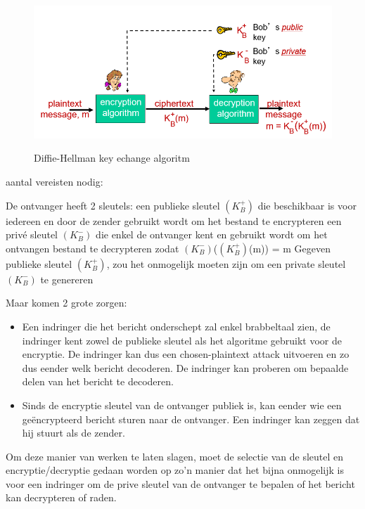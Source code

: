 \begin{figure}[h]
    \centering
    \includegraphics[width=7in]{./img/imghfdst8/hfdst8puntje5.png}\\[1cm]
    \caption{Diffie-Hellman key echange algoritm }      
    \label{fig:Diffie-Hellman key echange algoritm }
\end{figure}

\noindent aantal vereisten nodig:

\be
\itf De ontvanger heeft 2 sleutels:
    \be
    \itf een publieke sleutel $(K^+_B)$ die beschikbaar is voor iedereen en door de zender gebruikt wordt om het bestand te encrypteren
    \itf een privé sleutel $(K^-_B)$ die enkel de ontvanger kent en gebruikt wordt om het ontvangen bestand te decrypteren
   \itf zodat $(K^-_B)$($(K^+_B)$(m)) = m
    \ee
\itf Gegeven publieke sleutel $(K^+_B)$, zou het onmogelijk moeten zijn om een private sleutel $(K^-_B)$ te genereren
\ee

Maar komen 2 grote zorgen:
\begin{itemize}
\item Een indringer die het bericht onderschept zal enkel brabbeltaal zien, de indringer kent zowel de publieke sleutel als het algoritme gebruikt voor de encryptie. De indringer kan dus een chosen-plaintext attack uitvoeren en zo dus eender welk bericht decoderen. De indringer kan proberen om bepaalde delen van het bericht te decoderen.
\item Sinds de encryptie sleutel van de ontvanger publiek is, kan eender wie een geëncrypteerd bericht sturen naar de ontvanger. Een indringer kan zeggen dat hij stuurt als de zender.

\end{itemize}

\noindent Om deze manier van werken te laten slagen, moet de selectie van de sleutel en encryptie/decryptie gedaan worden op zo’n manier dat het bijna onmogelijk is voor een indringer om de prive sleutel van de ontvanger te bepalen of het bericht kan decrypteren of raden.

